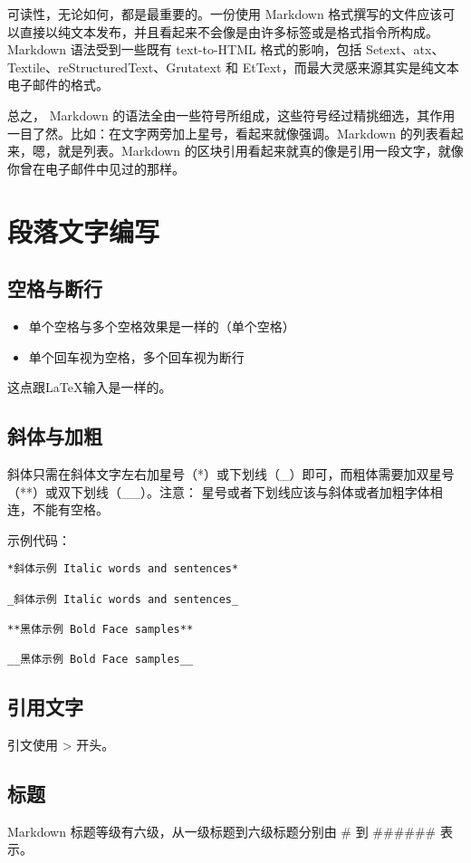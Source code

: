 可读性，无论如何，都是最重要的。一份使用 Markdown 格式撰写的文件应该可以直接以纯文本发布，并且看起来不会像是由许多标签或是格式指令所构成。Markdown 语法受到一些既有 text-to-HTML 格式的影响，包括 Setext、atx、Textile、reStructuredText、Grutatext 和 EtText，而最大灵感来源其实是纯文本电子邮件的格式。

总之， Markdown 的语法全由一些符号所组成，这些符号经过精挑细选，其作用一目了然。比如：在文字两旁加上星号，看起来就像强调。Markdown 的列表看起来，嗯，就是列表。Markdown 的区块引用看起来就真的像是引用一段文字，就像你曾在电子邮件中见过的那样。


\section{段落文字编写}
\subsection{空格与断行}
\begin{itemize}
\item 单个空格与多个空格效果是一样的（单个空格）
\item 单个回车视为空格，多个回车视为断行
\end{itemize}
这点跟\LaTeX 输入是一样的。


\subsection{斜体与加粗}
斜体只需在斜体文字左右加星号（*）或下划线（\_）即可，而粗体需要加双星号（**）或双下划线（\_\_）。注意： 星号或者下划线应该与斜体或者加粗字体相连，不能有空格。

示例代码：
\begin{verbatim}
*斜体示例 Italic words and sentences*

_斜体示例 Italic words and sentences_

**黑体示例 Bold Face samples**

__黑体示例 Bold Face samples__
\end{verbatim}


\subsection{引用文字}
引文使用 > 开头。


\subsection{标题}
Markdown 标题等级有六级，从一级标题到六级标题分别由 \# 到 \#\#\#\#\#\# 表示。

